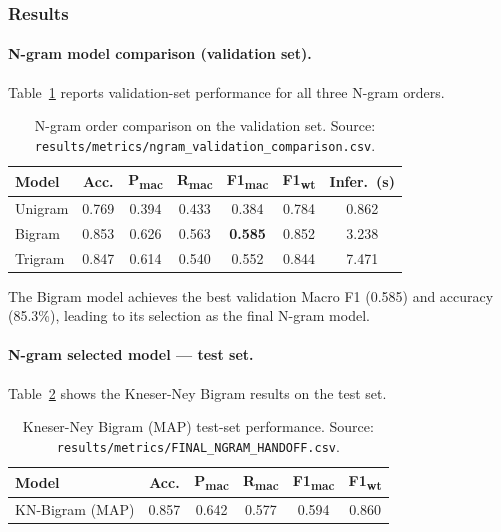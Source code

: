 \documentclass[11pt,a4paper]{article}
\begin{document}
\subsubsection{Results}

\paragraph{N-gram model comparison (validation set).}

Table~\ref{tab:ngram_val} reports validation-set performance for all three
N-gram orders.

\begin{table}[h!]
\centering
\caption{N-gram order comparison on the validation set.
         Source: \texttt{results/metrics/ngram\_validation\_comparison.csv}.}
\label{tab:ngram_val}
\begin{tabular}{lcccccc}
\toprule
\textbf{Model} & \textbf{Acc.} &
  \textbf{P\textsubscript{mac}} & \textbf{R\textsubscript{mac}} &
  \textbf{F1\textsubscript{mac}} & \textbf{F1\textsubscript{wt}} &
  \textbf{Infer.\ (s)} \\
\midrule
Unigram & 0.769 & 0.394 & 0.433 & 0.384 & 0.784 & 0.862 \\
Bigram  & 0.853 & 0.626 & 0.563 & \textbf{0.585} & 0.852 & 3.238 \\
Trigram & 0.847 & 0.614 & 0.540 & 0.552 & 0.844 & 7.471 \\
\bottomrule
\end{tabular}
\end{table}

The Bigram model achieves the best validation Macro F1 (0.585) and
accuracy (85.3\%), leading to its selection as the final N-gram model.

\paragraph{N-gram selected model --- test set.}

Table~\ref{tab:ngram_test} shows the Kneser-Ney Bigram results on the test set.

\begin{table}[h!]
\centering
\caption{Kneser-Ney Bigram (MAP) test-set performance.
         Source: \texttt{results/metrics/FINAL\_NGRAM\_HANDOFF.csv}.}
\label{tab:ngram_test}
\begin{tabular}{lccccc}
\toprule
\textbf{Model} & \textbf{Acc.} &
  \textbf{P\textsubscript{mac}} & \textbf{R\textsubscript{mac}} &
  \textbf{F1\textsubscript{mac}} & \textbf{F1\textsubscript{wt}} \\
\midrule
KN-Bigram (MAP) & 0.857 & 0.642 & 0.577 & 0.594 & 0.860 \\
\bottomrule
\end{tabular}
\end{table}
\end{document}
